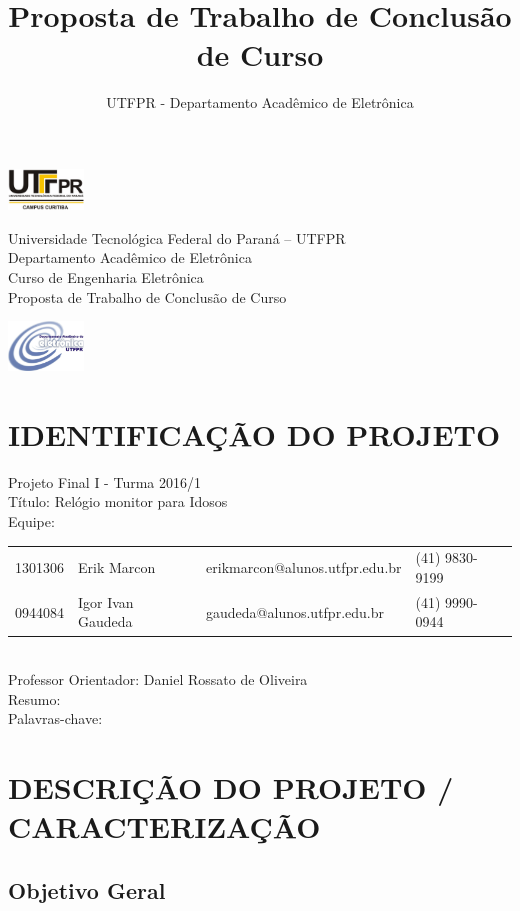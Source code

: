 \documentclass[a4paper]{article}
\title{Proposta de Trabalho de Conclusão de Curso}
\author{UTFPR - Departamento Acadêmico de Eletrônica}
\date{\the\year}
\begin{document}
\noindent
\includegraphics[width=0.15\textwidth]{figuras/UTFPR.png}
\begin{minipage}[b]{0.7\textwidth}
\centering
\Large{
Universidade Tecnológica Federal do Paraná – UTFPR\\
Departamento Acadêmico de Eletrônica\\
Curso de Engenharia Eletrônica \\
Proposta de Trabalho de Conclusão de Curso}
\end{minipage}
\includegraphics[width=0.15\textwidth]{figuras/daeln.jpg}

\section{IDENTIFICAÇÃO DO PROJETO}

Projeto Final I - Turma 2016/1 \\

Título: Relógio monitor para Idosos \\

Equipe:
\newline
	
\begin{tabular}{llll}
	1301306 & Erik Marcon & erikmarcon@alunos.utfpr.edu.br & (41) 9830-9199 \\
	0944084 & Igor Ivan Gaudeda & gaudeda@alunos.utfpr.edu.br & (41) 9990-0944
\end{tabular} \\

Professor Orientador: Daniel Rossato de Oliveira \\

Resumo: \\

Palavras-chave: 

\section{DESCRIÇÃO DO PROJETO / CARACTERIZAÇÃO}

\subsection{Objetivo Geral}
\end{document}
